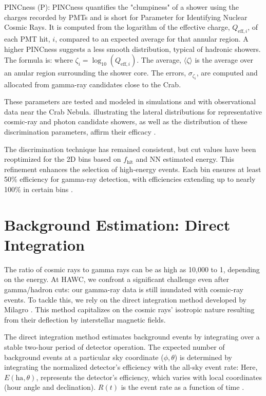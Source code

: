 PINCness (P): PINCness quantifies the "clumpiness" of a shower using the charges recorded by PMTs and is short for Parameter for Identifying Nuclear Cosmic Rays.
It is computed from the logarithm of the effective charge, $Q_{\mathrm{eff},i}$, of each PMT hit, $i$, compared to an expected average for that annular region.
A higher PINCness suggests a less smooth distribution, typical of hadronic showers.
The formula is:
\pincness
where $\zeta_i = \log_{10}(Q_{\mathrm{eff},i})$.
The average, $\langle \zeta \rangle$ is the average over an anular region surrounding the shower core.
The errors, $\sigma_{\zeta_i}$, are computed and allocated from gamma-ray candidates close to the Crab.

These parameters are tested and modeled in simulations and with observational data near the Crab Nebula.
 illustrating the lateral distributions for representative cosmic-ray and photon candidate showers, as well as the distribution of these discrimination parameters, affirm their efficacy \cite{Abeysekara_2017}.

The discrimination technique has remained consistent, but cut values have been reoptimized for the 2D bins based on $f_{\text{hit}}$ and NN estimated energy.
This refinement enhances the selection of high-energy events.
Each bin ensures at least 50\% efficiency for gamma-ray detection, with efficiencies extending up to nearly 100\% in certain bins \cite{Abeysekara_2017,100TEV_Crab_HAWC}.

\section{Background Estimation: Direct Integration}\label{hawc:direc_int}

The ratio of cosmic rays to gamma rays can be as high as 10,000 to 1, depending on the energy.
At HAWC, we confront a significant challenge even after gamma/hadron cuts: our gamma-ray data is still inundated with cosmic-ray events.
To tackle this, we rely on the direct integration method developed by Milagro \cite{Milagro_crab}.
This method capitalizes on the cosmic rays' isotropic nature resulting from their deflection by interstellar magnetic fields.

The direct integration method estimates background events by integrating over a stable two-hour period of detector operation.
The expected number of background events at a particular sky coordinate ($\phi, \theta$) is determined by integrating the normalized detector's efficiency with the all-sky event rate:
\directInt
Here, $E(\text{ha}, \theta)$, represents the detector's efficiency, which varies with local coordinates (hour angle and declination).
$R(t)$ is the event rate as a function of time \cite{Milagro_crab}.

